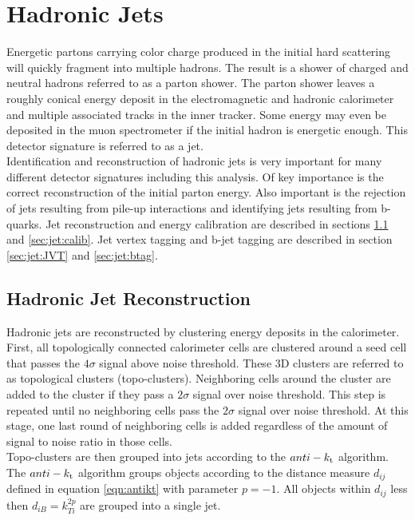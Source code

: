 \section{Hadronic Jets}
\label{sec:reco:jets}

\indent Energetic partons carrying color charge produced in the initial hard scattering will quickly fragment into multiple hadrons.  The result is a shower of charged and neutral hadrons referred to as a parton shower.  The parton shower leaves a roughly conical energy deposit in the electromagnetic and hadronic calorimeter and multiple associated tracks in the inner tracker.  Some energy may even be deposited in the muon spectrometer if the initial hadron is energetic enough.  This detector signature is referred to as a jet. \\

\indent Identification and reconstruction of hadronic jets is very important for many different detector signatures including this analysis.  Of key importance is the correct reconstruction of the initial parton energy.  Also important is the rejection of jets resulting from pile-up interactions and identifying jets resulting from b-quarks.  Jet reconstruction and energy calibration are described in sections \ref{sec:jet:reco} and \ref{sec:jet:calib}.  Jet vertex tagging and b-jet tagging are described in section \ref{sec:jet:JVT} and \ref{sec:jet:btag}.

\subsection{Hadronic Jet Reconstruction}
\label{sec:jet:reco}

\indent Hadronic jets are reconstructed by clustering energy deposits in the calorimeter. First, all topologically connected calorimeter cells are clustered around a seed cell that passes the $4\sigma$ signal above noise threshold.  These 3D clusters are referred to as topological clusters (topo-clusters).\cite{jetReco7TeV,jetReco13TeV}  Neighboring cells around the cluster are added to the cluster if they pass a $2\sigma$ signal over noise threshold. This step is repeated until no neighboring cells pass the $2\sigma$ signal over noise threshold.  At this stage, one last round of neighboring cells is added regardless of the amount of signal to noise ratio in those cells. \\

\indent Topo-clusters are then grouped into jets according to the $anti-k_{\rm{t}}$ algorithm.  The $anti-k_{\rm{t}}$ algorithm groups objects according to the distance measure $d_{ij}$ defined in equation \ref{eqn:antikt} with parameter $p=-1$.  All objects within $d_{ij}$ less then $d_{iB}=k^{2p}_{Ti}$ are grouped into a single jet.  \\


